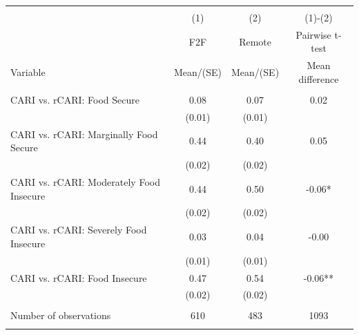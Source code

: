 
\begin{tabular}{@{\extracolsep{5pt}}lccc}
\\[-1.8ex]\hline \hline \\[-1.8ex]
 & \multicolumn{1}{c}{(1)}  & \multicolumn{1}{c}{(2)}  & \multicolumn{1}{c}{(1)-(2)} \\
 & \multicolumn{1}{c}{F2F}  & \multicolumn{1}{c}{Remote}  & \multicolumn{1}{c}{Pairwise t-test}  \\
Variable & Mean/(SE) & Mean/(SE) & Mean difference \\ \hline \\[-1.8ex] 
CARI vs. rCARI: Food Secure   & 0.08    & 0.07    & 0.02   \\
 & (0.01)  & (0.01)  &  \\ [1ex]
CARI vs. rCARI: Marginally Food Secure   & 0.44    & 0.40    & 0.05   \\
 & (0.02)  & (0.02)  &  \\ [1ex]
CARI vs. rCARI: Moderately Food Insecure   & 0.44    & 0.50    & -0.06*   \\
 & (0.02)  & (0.02)  &  \\ [1ex]
CARI vs. rCARI: Severely Food Insecure   & 0.03    & 0.04    & -0.00   \\
 & (0.01)  & (0.01)  &  \\ [1ex]
CARI vs. rCARI: Food Insecure   & 0.47    & 0.54    & -0.06**   \\
 & (0.02)  & (0.02)  &  \\ [1ex]
\hline \\[-1.8ex]
Number of observations  & 610   & 483  & 1093  \\
\hline \hline \\[-1.8ex]

\end{tabular}
